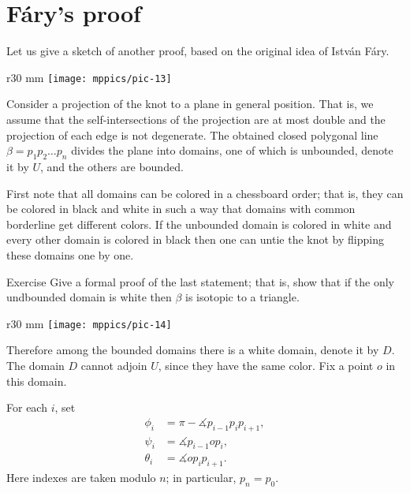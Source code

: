 \section{F\'ary's proof}

Let us give a sketch of another proof, based on the original idea of Istv\'an F\'ary.

\begin{wrapfigure}{r}{30 mm}
\vskip-0mm
\centering
\texttt{[image: mppics/pic-13]}
\vskip0mm
\end{wrapfigure}

Consider a projection of the knot to a plane in general position.
That is, we assume that the self-intersections of the projection are at most double and the projection of each edge is not degenerate.
The obtained closed polygonal line $\beta=p_1p_2\dots p_n$ divides the plane into domains, one of which is unbounded, denote it by $U$, and the others are bounded.

First note that all domains can be colored in a chessboard order;
that is, they can be colored in black and white in such a way that domains with common borderline get different colors.
If the unbounded domain is colored in white and every other domain is colored in black then one can untie the knot by flipping these domains one by one.

\begin{thm}{Exercise}
Give a formal proof of the last statement; that is, show that if the only undbounded domain is white then $\beta$ is isotopic to a triangle. 
\end{thm}

\begin{wrapfigure}{r}{30 mm}
\vskip-4mm
\centering
\texttt{[image: mppics/pic-14]}
\vskip0mm
\end{wrapfigure}

Therefore among the bounded domains there is a white domain, denote it by $D$.
The domain $D$ cannot adjoin %
$U$, since they have the same color.
Fix a point $o$ in this domain.

For each $i$, set 
\begin{align*}
\phi_i&=\pi-\measuredangle p_{i-1}p_ip_{i+1},
\\
\psi_i&=\measuredangle p_{i-1} o p_{i},
\\
\theta_i&=\measuredangle o p_i p_{i+1}.
\end{align*}
Here indexes are taken modulo $n$; in particular, $p_{n}=p_0$.



